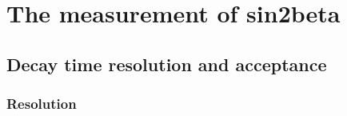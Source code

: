 
\chapter{The measurement of sin2beta}
\label{ch:app:measurement_of_sin2beta}

\section{Decay time resolution and acceptance}
\label{sec:app:measurement_of_sin2beta:resolution_and_acceptance}

\subsection{Resolution}
\label{sec:app:measurement_of_sin2beta:resolution_and_acceptance:resolution}

